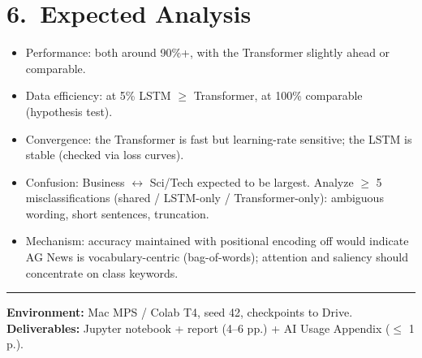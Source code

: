 \documentclass[11pt,a4paper]{article}
\begin{document}
\section*{6.\ Expected Analysis}
\begin{itemize}
\item Performance: both around 90\%+, with the Transformer slightly ahead or comparable.
\item Data efficiency: at 5\% LSTM $\geq$ Transformer, at 100\% comparable (hypothesis test).
\item Convergence: the Transformer is fast but learning-rate sensitive; the LSTM is stable (checked via loss curves).
\item Confusion: Business $\leftrightarrow$ Sci/Tech expected to be largest. Analyze $\geq$ 5 misclassifications (shared / LSTM-only / Transformer-only): ambiguous wording, short sentences, truncation.
\item Mechanism: accuracy maintained with positional encoding off would indicate AG News is vocabulary-centric (bag-of-words); attention and saliency should concentrate on class keywords.
\end{itemize}

\vspace{0.5em}\hrule\vspace{0.5em}
\textbf{Environment:} Mac MPS / Colab T4, seed 42, checkpoints to Drive. \quad
\textbf{Deliverables:} Jupyter notebook + report (4--6 pp.) + AI Usage Appendix ($\leq$ 1 p.).
\end{document}
